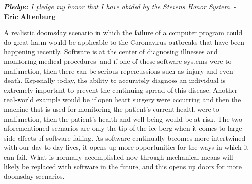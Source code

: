 \newcommand\NAME{Eric Altenburg}  %
\newcommand\COURSE{CS 347}
\newcommand\HWNUM{1}              %


\begin{center}
	\textit{\textbf{Pledge:} I pledge my honor that I have abided by the Stevens Honor System.} - \textbf{\NAME}
\end{center}


	A realistic doomsday scenario in which the failure of a computer program could do great harm would be applicable to the Coronavirus outbreaks that have been happening recently. Software is at the center of diagnosing illnesses and monitoring medical procedures, and if one of these software systems were to malfunction, then there can be serious repercussions such as injury and even death. Especially today, the ability to accurately diagnose an individual is extremely important to prevent the continuing spread of this disease. Another real-world example would be if open heart surgery were occurring and then the machine that is used for monitoring the patient's current health were to malfunction, then the patient's health and well being would be at risk. The two aforementioned scenarios are only the tip of the ice berg when it comes to large side effects of software failing. As software continually becomes more intertwined with our day-to-day lives, it opens up more opportunities for the ways in which it can fail. What is normally accomplished now through mechanical means will likely be replaced with software in the future, and this opens up doors for more doomsday scenarios.
	

